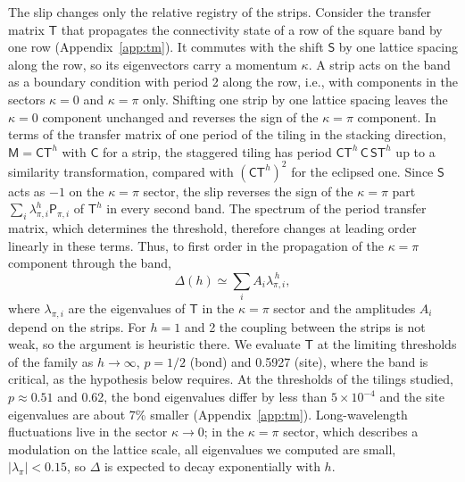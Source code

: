 \documentclass[pre,twocolumn,superscriptaddress,longbibliography,floatfix]{revtex4-2}
\begin{document}
The slip changes only the relative registry of the strips. Consider the transfer matrix $\mathsf T$ that propagates the connectivity state of a row of the square band by one row (Appendix~\ref{app:tm}). It commutes with the shift $\mathsf S$ by one lattice spacing along the row, so its eigenvectors carry a momentum $\kappa$. A strip acts on the band as a boundary condition with period 2 along the row, i.e., with components in the sectors $\kappa=0$ and $\kappa=\pi$ only. Shifting one strip by one lattice spacing leaves the $\kappa=0$ component unchanged and reverses the sign of the $\kappa=\pi$ component. In terms of the transfer matrix of one period of the tiling in the stacking direction, $\mathsf M=\mathsf C\mathsf T^h$ with $\mathsf C$ for a strip, the staggered tiling has period $\mathsf C\mathsf T^h\,\mathsf C\,\mathsf S\mathsf T^h$ up to a similarity transformation, compared with $(\mathsf C\mathsf T^h)^2$ for the eclipsed one. Since $\mathsf S$ acts as $-1$ on the $\kappa=\pi$ sector, the slip reverses the sign of the $\kappa=\pi$ part $\sum_i\lambda_{\pi,i}^h\mathsf P_{\pi,i}$ of $\mathsf T^h$ in every second band. The spectrum of the period transfer matrix, which determines the threshold, therefore changes at leading order linearly in these terms. Thus, to first order in the propagation of the $\kappa=\pi$ component through the band,
\begin{equation}
\Delta(h)\simeq\sum_i A_i\lambda_{\pi,i}^{\,h},
\label{eq:tm}
\end{equation}
where $\lambda_{\pi,i}$ are the eigenvalues of $\mathsf T$ in the $\kappa=\pi$ sector and the amplitudes $A_i$ depend on the strips. For $h=1$ and 2 the coupling between the strips is not weak, so the argument is heuristic there. We evaluate $\mathsf T$ at the limiting thresholds of the family as $h\to\infty$, $p=1/2$ (bond) and 0.5927 (site), where the band is critical, as the hypothesis below requires. At the thresholds of the tilings studied, $p\approx0.51$ and 0.62, the bond eigenvalues differ by less than $5\times10^{-4}$ and the site eigenvalues are about 7\% smaller (Appendix~\ref{app:tm}). Long-wavelength fluctuations live in the sector $\kappa\to0$; in the $\kappa=\pi$ sector, which describes a modulation on the lattice scale, all eigenvalues we computed are small, $|\lambda_\pi|<0.15$, so $\Delta$ is expected to decay exponentially with $h$.
\end{document}

